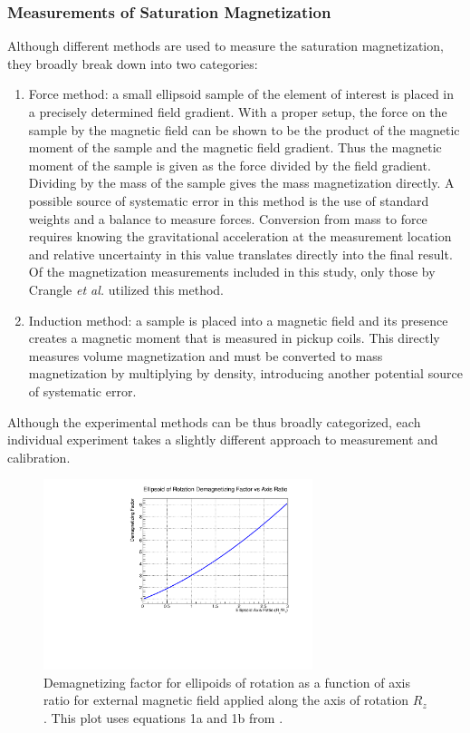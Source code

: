 \documentclass[preprint,12pt]{elsarticle}
\begin{document}
 
 \subsubsection{Measurements of Saturation Magnetization}
Although different methods are used to measure the saturation magnetization, they broadly break down into two categories: 
\begin{enumerate}
\item{ Force method: a small ellipsoid sample of the element of interest is placed in a precisely determined field gradient. With a proper setup, the force on the sample by the magnetic field can be shown to be the product of the magnetic moment of the sample and the magnetic field gradient. Thus the magnetic moment of the sample is given as the force divided by the field gradient. Dividing by the mass of the sample gives the mass magnetization directly. A possible source of systematic error in this method is the use of standard weights and a balance to measure forces. Conversion from  mass to force requires knowing the gravitational acceleration at the measurement location and relative uncertainty in this value translates directly into the final result. Of the magnetization measurements  included in this study, only those by Crangle {\it et al.} utilized this method. }
\item{ Induction method: a sample is placed into a magnetic field and its presence creates a magnetic moment that is measured in pickup coils. This directly measures volume magnetization and must be converted to mass magnetization by multiplying by density, introducing another potential source of systematic error.}
\end{enumerate}
     
Although the experimental methods can be thus broadly categorized, each individual experiment takes a slightly different approach to measurement and calibration.
\begin{figure}
\centering
\includegraphics[width=0.7\textwidth]{demagnetizing_factor.pdf}
\caption{Demagnetizing factor for ellipoids of rotation as a function of axis ratio for external magnetic field applied along the axis of rotation $R_z$. This plot uses equations 1a and 1b from \cite{Skomski2007}.}
\label{fig:demag_ellipsoid}
\end{figure}
\end{document}
